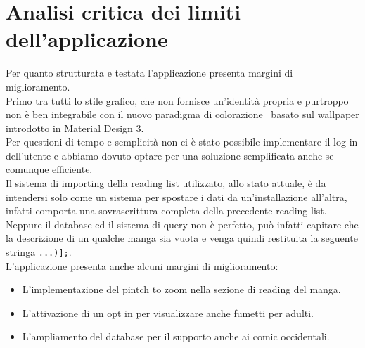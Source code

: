 \documentclass[../Assignment-3-LPSMT.tex]{subfiles}
\begin{document}
\chapter{Analisi critica dei limiti dell’applicazione}

Per quanto strutturata e testata l'applicazione presenta margini di miglioramento.\\
Primo tra tutti lo stile grafico, che non fornisce un'identità propria e purtroppo non è ben integrabile con il nuovo paradigma di colorazione~\cite{matDesColor} basato sul wallpaper introdotto in Material Design 3.\\
Per questioni di tempo e semplicità non ci è stato possibile implementare il log in dell'utente e abbiamo dovuto optare per una soluzione semplificata anche se comunque efficiente.\\
Il sistema di importing della reading list utilizzato, allo stato attuale, è da intendersi solo come un sistema per spostare i dati da un'installazione all'altra, infatti comporta una sovrascrittura completa della precedente reading list.\\
Neppure il database ed il sistema di query non è perfetto, può infatti capitare che la descrizione di un qualche manga sia vuota e venga quindi restituita la seguente stringa \verb+...)];+.\\
L'applicazione presenta anche alcuni margini di miglioramento:
\begin{itemize}
  \item L'implementazione del pintch to zoom nella sezione di reading del manga.
  \item L'attivazione di un opt in per visualizzare anche fumetti per adulti.
  \item L'ampliamento del database per il supporto anche ai comic occidentali.
\end{itemize}
\end{document}
